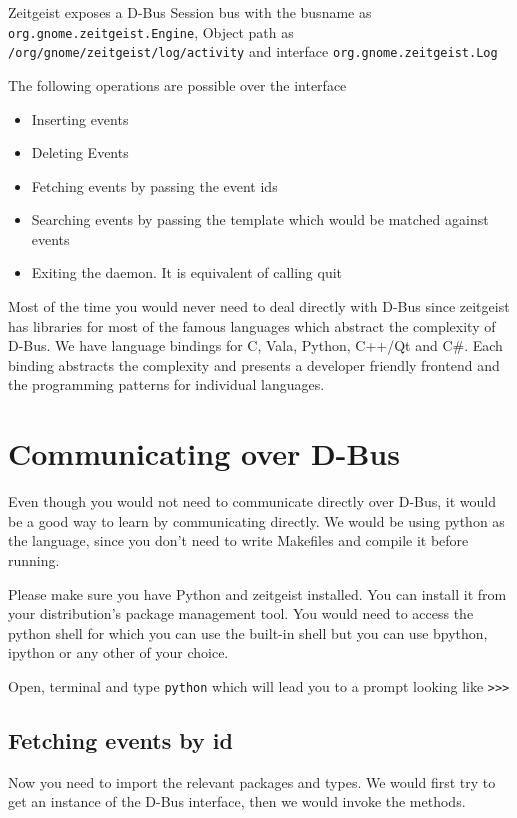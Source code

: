 Zeitgeist exposes a D-Bus Session bus with the busname as \texttt{org.gnome.zeitgeist.Engine}, 
Object path as \texttt{/org/gnome/zeitgeist/log/activity} and interface 
\texttt{org.gnome.zeitgeist.Log}


The following operations are possible over the interface

\begin{itemize}
\item Inserting events
\item Deleting Events
\item Fetching events by passing the event ids
\item Searching events by passing the template which would be matched against events
\item Exiting the daemon. It is equivalent of calling quit
\end{itemize}

Most of the time you would never need to deal directly with D-Bus since zeitgeist has 
libraries for most of the famous languages which abstract the complexity of D-Bus. We 
have language bindings for C, Vala, Python, C++/Qt and C\#. Each binding abstracts the 
complexity and presents a developer friendly frontend and the programming patterns 
for individual languages.

\section{Communicating over D-Bus}

Even though you would not need to communicate directly over D-Bus, it would be a good 
way to learn by communicating directly. We would be using python as the language, since 
you don't need to write Makefiles and compile it before running.

Please make sure you have Python and zeitgeist installed. You can install it from your 
distribution's package management tool. You would need to access the python shell for 
which you can use the built-in shell but you can use bpython, ipython or any other 
of your choice.

Open, terminal and type \texttt{python} which will lead you to a prompt looking like 
\texttt{>>>}

\subsection{Fetching events by id}

Now you need to import the relevant packages and types. We would first try to get an 
instance of the D-Bus interface, then we would invoke the methods.

